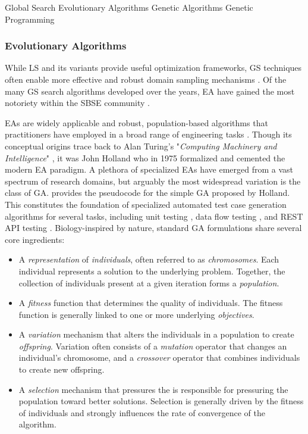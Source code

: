  {Global Search}
 {Evolutionary Algorithms}
 {Genetic Algorithms}
 {Genetic Programming}

\subsubsection{Evolutionary Algorithms}

While \gls{LS} and its variants
provide useful optimization frameworks, \Gls{GS} techniques often
enable more effective and robust domain sampling mechanisms \cite{mcminn2004search}.
Of the many \gls{GS} search algorithms developed over the years, \Gls{EA} have gained
the most notoriety within the \gls{SBSE} community \cite{harman2011software}.

\gls{EA}s are widely applicable and robust, population-based algorithms
that practitioners have employed in a broad range of engineering tasks \cite{harman2011software}.
Though its conceptual origins trace back to Alan Turing's "\textit{Computing Machinery and Intelligence}" \cite{turing1950computing}, it was John Holland \cite{jh1975adaptation}
who in 1975 formalized and cemented the modern \gls{EA} paradigm.
A plethora of specialized \gls{EA}s have emerged from a vast spectrum of 
research domains, but arguably the most widespread variation is the
class of \Gls{GA}.
 provides the pseudocode for the simple \gls{GA}
proposed by Holland.
This constitutes the foundation of specialized automated test case generation algorithms
for several tasks, including unit testing 
\cite{tonella2004evolutionary, panichella2017automated},
data flow testing \cite{girgis2005automatic}, and REST API testing
\cite{arcuri2019restful}.
Biology-inspired by nature, standard \gls{GA} formulations share several core ingredients:
\begin{itemize}
\item A \textit{representation} of \textit{individuals},
	often referred to as \textit{chromosomes}.
	Each individual represents a solution to the underlying
	problem.
	Together, the collection of individuals present at
	a given iteration forms a \textit{population}.

\item A \textit{fitness} function that determines
	the quality of individuals. 
	The fitness function is generally linked
	to one or more underlying \textit{objectives}.

\item A \textit{variation} mechanism that alters
	the individuals in a population to create \textit{offspring}.
	Variation often consists of a \textit{mutation} operator
	that changes an individual's chromosome, and a \textit{crossover}
	operator that combines individuals to create new offspring.
	
\item A \textit{selection} mechanism that pressures the is responsible
	for pressuring the population toward better solutions. Selection
	is generally driven by the fitness of individuals and strongly
	influences the rate of convergence of the algorithm.
\end{itemize}

